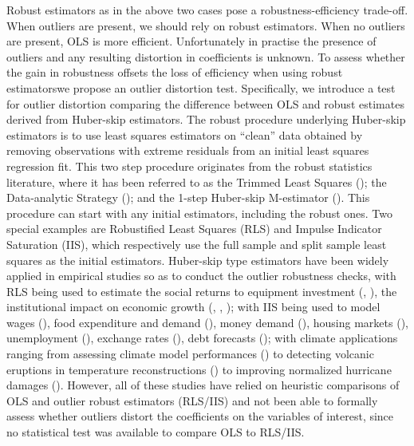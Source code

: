 \documentclass[11pt, letterpaper]{article}
\numberwithin{algorithm}{section}
\numberwithin{assumption}{section}
\numberwithin{lemma}{section}
\numberwithin{theorem}{section}
\numberwithin{corollary}{section}
\numberwithin{remark}{section}
\numberwithin{equation}{section}
\numberwithin{figure}{section}
\numberwithin{table}{section}
\providecommand{\DIFadd}[1]{{\protect\color{blue}\uwave{#1}}} %
\providecommand{\DIFaddbegin}{} %
\providecommand{\DIFaddend}{} %
\newcommand{\DIFaddincludegraphics}[2][]{{\color{blue}\fbox{\DIFOincludegraphics[#1]{#2}}}} %
\DeclareRobustCommand{\DIFaddbegin}{\DIFOaddbegin \let\includegraphics\DIFaddincludegraphics} %
\DeclareRobustCommand{\DIFaddend}{\DIFOaddend \let\includegraphics\DIFOincludegraphics} %
\begin{document}
Robust estimators as in the above two cases pose a robustness-efficiency trade-off. When outliers are present, we should rely on robust estimators. When no outliers are present, OLS is more efficient. Unfortunately in practise the presence of outliers and any resulting distortion in coefficients is unknown. To assess whether the gain in robustness offsets the loss of efficiency when using robust estimators\DIFaddbegin \DIFadd{, }\DIFaddend we propose an outlier distortion test. Specifically, we introduce a test for outlier distortion comparing the difference between OLS and robust estimates derived from Huber-skip estimators. The robust procedure underlying Huber-skip estimators is to use least squares estimators on ``clean'' data obtained by removing observations with extreme residuals from an initial least squares regression fit. This two step procedure originates from the robust statistics literature, where it has been referred to as the Trimmed Least Squares (\citealt{ruppert1980trimmed}); the Data-analytic Strategy (\citealt{welsh2002journey}); and the 1-step Huber-skip M-estimator (\citealt{johansen2009analysis}). This procedure can start with any initial estimators, including the robust ones. Two special examples are Robustified Least Squares (RLS) and Impulse Indicator Saturation (IIS), which respectively use the full sample and split sample least squares as the initial estimators. Huber-skip type estimators have been widely applied in empirical studies so as to conduct the outlier robustness checks, with RLS being used to estimate the social returns to equipment investment (\citealt{de1991equipment, de1994equipment}, \citealt{auerbach1994reassessing}), the institutional impact on economic growth (\citealt{acemoglu2001colonial, acemoglu2012colonial}, \citealt{albouy2012colonial}, \citealt{acemoglu2019democracy}); with IIS being used to model wages (\citealt{castle2009long}), food expenditure and demand (\citealt{hendry2011econometric}), money demand (\citealt{dreger2014money}), housing markets (\citealt{anundsen2015econometric}), unemployment (\citealt{nymoen2015equilibrium}), exchange rates (\citealt{stillwagon2016non}), debt forecasts (\citealt{ericsson2017biased}); with climate applications ranging from assessing climate model performances (\citealt{pretis2015testing}) to detecting volcanic eruptions in temperature reconstructions (\citealt{schneider2017new}) to improving normalized hurricane damages (\citealt{martinez2020improving}). However, all of these studies have relied on heuristic comparisons of OLS and outlier robust estimators (RLS/IIS) and \DIFaddbegin \DIFadd{have }\DIFaddend not been able to formally assess whether outliers distort the coefficients on the variables of interest, since no statistical test was available to compare OLS to RLS/IIS.
\end{document}
